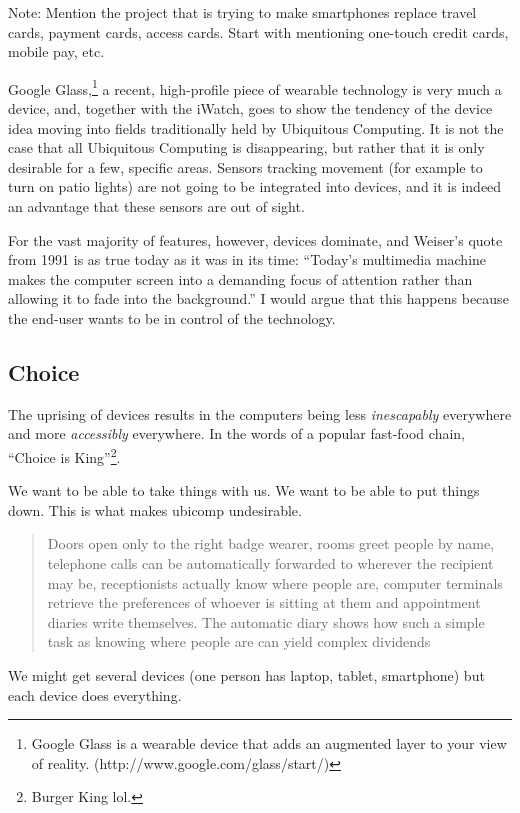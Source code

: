 Note: Mention the project that is trying to make smartphones replace travel cards, payment cards, access cards. Start with mentioning
one-touch credit cards, mobile pay, etc.

Google Glass,\footnote{Google Glass is a wearable device that adds an augmented layer to your view of reality. (http://www.google.com/glass/start/)}
a recent, high-profile piece of wearable technology is very much a device, and, together with the iWatch, goes to show the tendency of the device
idea moving into fields traditionally held by Ubiquitous Computing. It is not the case that all Ubiquitous Computing is disappearing, but rather
that it is only desirable for a few, specific areas. Sensors tracking movement (for example to turn on patio lights) are not going to be integrated
into devices, and it is indeed an advantage that these sensors are out of sight.

For the vast majority of features, however, devices dominate, and Weiser's quote from 1991 is as true today as it was in its
time: ``Today's multimedia machine makes the computer screen into a demanding focus of attention rather than allowing it to fade into the
background.''\cite{weiser91} I would argue that this happens because the end-user wants to be in control of the technology.

\subsection*{Choice}

The uprising of devices results in the computers being less \emph{inescapably} everywhere and more \emph{accessibly} everywhere. In the words
of a popular fast-food chain, ``Choice is King''\footnote{Burger King lol.}.

We want to be able to take things with us. We want to be able to put things down. This is what makes ubicomp undesirable.

\begin{quote}
    Doors open only to the right badge wearer, rooms greet people by name, telephone calls can be automatically forwarded to wherever the recipient may be, receptionists actually know where people are, computer terminals retrieve the preferences of whoever is sitting at them and appointment diaries write themselves. The automatic diary shows how such a simple task as knowing where people are can yield complex dividends\cite{weiser91}
\end{quote}

We might get several devices (one person has laptop, tablet, smartphone) but each device does everything.

